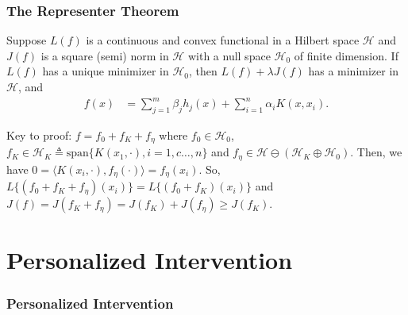 \documentclass{beamer}
\def\cal{\mathcal}
\begin{document}
\begin{frame}
	\frametitle{The Representer Theorem}
	\begin{theorem}
		Suppose $L(f)$ is a continuous and convex functional in a Hilbert space ${\cal H}$ and $J(f)$ is a square (semi) norm in ${\cal H}$ with a null space ${\cal H}_0$ of finite dimension. If $L(f)$ has a unique minimizer in ${\cal H}_0$, then $L(f)+\lambda J(f)$ has a minimizer in ${\cal H}$, and
		\begin{align*}
			f(x) &= \sum_{j=1}^m \beta_j h_j(x) + \sum_{i=1}^n \alpha_i K(x,x_i).
		\end{align*}
	
	\end{theorem}
	Key to proof: $f=f_0+f_K + f_{\eta}$ where $f_0 \in {\cal H}_0$, $f_K \in {\cal H}_K \triangleq\mbox{span}\{K(x_1,\cdot), i=1,c\dots,n\}$ and $f_\eta \in {\cal H}\ominus({\cal H}_K\oplus{\cal H}_0)$. Then, we have $0=\langle K(x_i,\cdot), f_\eta(\cdot)\rangle=f_\eta(x_i)$. So, $L\{(f_0+f_K + f_{\eta})(x_i)\}=L\{(f_0+f_K)(x_i)\}$ and $J(f)=J(f_K+f_\eta)=J(f_K)+J(f_\eta) \ge J(f_K)$.
\end{frame}

\section{Personalized Intervention}
\begin{frame}
\frametitle{Personalized Intervention}	
\end{frame}
\end{document}
